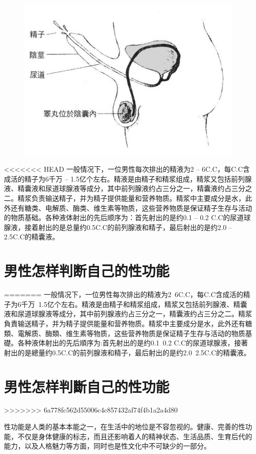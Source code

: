 \documentclass[12pt,UTF8]{ctexbook}
\begin{document}
\begin{figure}[htbp]
	\centering
	\includegraphics[width=0.7\linewidth]{5}
	\caption{}
\end{figure}

<<<<<<< HEAD
一般情况下，一位男性每次排出的精液为2 -- 6C.C，每C.C含成活的精子为6千万 -- 1.5亿个左右。精液是由精子和精浆组成，精浆又包括前列腺液、精囊液和尿道球腺液等成分，其中前列腺液约占三分之一，精囊液约占三分之二。精浆负责输送精子，并为精子提供能量和营养物质。精浆中主要成分是水，此外还有糖类、电解质、酶类、维生素等物质，这些营养物质是保证精子生存与活动的物质基础。各种液体射出的先后顺序为：首先射出的是约0.1 -- 0.2 C.C的尿道球腺液，接着射出的是总量约0.5C.C的前列腺液和精子，最后射出的是约2.0 -- 2.5C.C的精囊液。

\section{男性怎样判断自己的性功能}
=======
一般情况下，一位男性每次排出的精液为2~6C.C，每C.C含成活的精子为6千万~1.5亿个左右。精液是由精子和精浆组成，精浆又包括前列腺液、精囊液和尿道球腺液等成分，其中前列腺液约占三分之一，精囊液约占三分之二。精浆負責输送精子，并为精子提供能量和营养物质。精浆中主要成分是水，此外还有糖類、電解质、酶類、维生素等物质，这些营养物质是保证精子生存与活动的物质基礎。各种液体射出的先后順序为:首先射出的是约0.1~0.2 C.C的尿道球腺液，接著射出的是總量约0.5C.C的前列腺液和精子，最后射出的是约2.0~2.5C.C的精囊液。

\section{男性怎样判斷自己的性功能}
>>>>>>> 6a778fc562d55006c4c857432af74f4b1a2a4d80

性功能是人类的基本本能之一，在生活中的地位是不容忽视的。健康、完善的性功能，不仅是身体健康的标志，而且还影响着人的精神状态、生活品质、生育后代的能力，以及人格魅力等方面，同时也是性文化中不可缺少的一部分。
\end{document}
